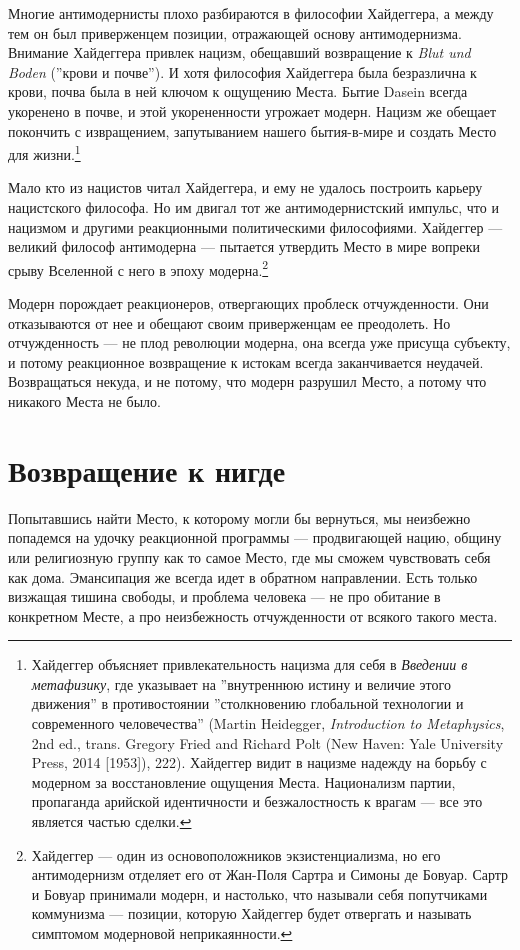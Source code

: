 \documentclass[12pt]{book}
\begin{document}
Многие антимодернисты плохо разбираются в философии Хайдеггера, а между тем он был приверженцем позиции, отражающей основу антимодернизма. Внимание Хайдеггера привлек нацизм, обещавший возвращение к \textit{Blut und Boden} (''крови и почве''). И хотя философия Хайдеггера была безразлична к крови, почва была в ней ключом к ощущению Места. Бытие Dasein всегда укоренено в почве, и этой укорененности угрожает модерн. Нацизм же обещает покончить с извращением, запутыванием нашего бытия-в-мире и создать Место для жизни.\footnote{Хайдеггер объясняет привлекательность нацизма для себя в \textit{Введении в метафизику}, где указывает на ''внутреннюю истину и величие этого движения'' в противостоянии ''столкновению глобальной технологии и современного человечества'' (Martin Heidegger, \textit{Introduction to Metaphysics}, 2nd ed., trans. Gregory Fried and Richard Polt (New Haven: Yale University Press, 2014 [1953]), 222). Хайдеггер видит в нацизме надежду на борьбу с модерном за восстановление ощущения Места. Национализм партии, пропаганда арийской идентичности и безжалостность к врагам --- все это является частью сделки.}

Мало кто из нацистов читал Хайдеггера, и ему не удалось построить карьеру нацистского философа. Но им двигал тот же антимодернистский импульс, что и нацизмом и другими реакционными политическими философиями. Хайдеггер --- великий философ антимодерна --- пытается утвердить Место в мире вопреки срыву Вселенной с него в эпоху модерна.\footnote{Хайдеггер --- один из основоположников экзистенциализма, но его антимодернизм отделяет его от Жан-Поля Сартра и Симоны де Бовуар. Сартр и Бовуар принимали модерн, и настолько, что называли себя попутчиками коммунизма --- позиции, которую Хайдеггер будет отвергать и называть симптомом модерновой неприкаянности.}

Модерн порождает реакционеров, отвергающих проблеск отчужденности. Они отказываются от нее и обещают своим приверженцам ее преодолеть. Но отчужденность --- не плод революции модерна, она всегда уже присуща субъекту, и потому реакционное возвращение к истокам всегда заканчивается неудачей. Возвращаться некуда, и не потому, что модерн разрушил Место, а потому что никакого Места не было.

\section{Возвращение к нигде}

Попытавшись найти Место, к которому могли бы вернуться, мы неизбежно попадемся на удочку реакционной программы --- продвигающей нацию, общину или религиозную группу как то самое Место, где мы сможем чувствовать себя как дома. Эмансипация же всегда идет в обратном направлении. Есть только визжащая тишина свободы, и проблема человека --- не про обитание в конкретном Месте, а про неизбежность отчужденности от всякого такого места.
\end{document}
